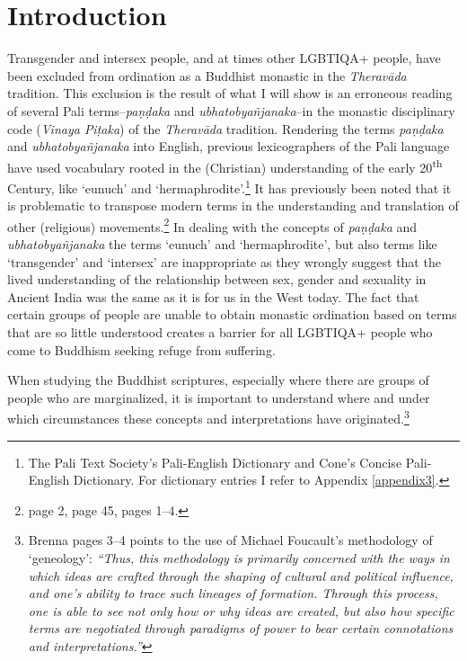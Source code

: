 \section{Introduction}
Transgender and intersex people, and at times other LGBTIQA+ people, have been excluded from ordination as a Buddhist monastic in the \textit{Theravāda} tradition. This exclusion is the result of what I will show is an erroneous reading of several Pali terms--\textit{paṇḍaka} and \textit{ubhatob­yañ­janaka}--in the monastic disciplinary code (\textit{Vinaya Piṭaka}) of the \textit{Theravāda} tradition. Rendering the terms \textit{paṇḍaka} and \textit{ubhatob­yañ­janaka} into English, previous lexicographers of the Pali language have used vocabulary rooted in the (Christian) understanding of the early 20\textsuperscript{th} Century, like `eunuch' and `hermaphrodite'.\footnote{The Pali Text Society's Pali-English Dictionary and Cone's Concise Pali-English Dictionary. For dictionary entries I refer to Appendix \ref{appendix3}.} It has previously been noted that it is problematic to transpose modern terms in the understanding and translation of other (religious) movements.\footnote{\cite{maes} page 2, \cite{dudas} page 45, \cite{artinger} pages 1–4.} In dealing with the concepts of \textit{paṇḍaka} and \textit{ubhatob­yañ­janaka} the terms `eunuch' and `hermaphrodite', but also terms like `transgender' and `intersex' are inappropriate as they wrongly suggest that the lived understanding of the relationship between sex, gender and sexuality in Ancient India was the same as it is for us in the West today. The fact that certain groups of people are unable to obtain monastic ordination based on terms that are so little understood creates a barrier for all LGBTIQA+ people who come to Buddhism seeking refuge from suffering.

When studying the Buddhist scriptures, especially where there are groups of people who are marginalized, it is important to understand where and under which circumstances these concepts and interpretations have originated.\footnote{Brenna \cite{artinger} pages 3–4 points to the use of Michael Foucault's methodology of `geneology': \textit{``Thus, this methodology is primarily concerned with the ways in which ideas are crafted through the shaping of cultural and political influence, and one's ability to trace such lineages of formation. Through this process, one is able to see not only how or why ideas are created, but also how specific terms are negotiated through paradigms of power to bear certain connotations and interpretations.''}}

